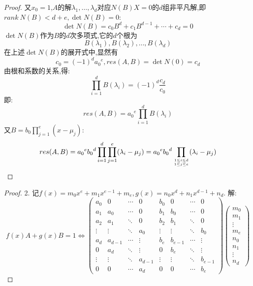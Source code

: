 \documentclass{article}
\begin{document}
\begin{enumerate}
\begin{proof}
    又$x_0=1$,$A$的解$\lambda_1,\ldots,\lambda_d$对应$N(B)X=0$的$d$组非平凡解,即$rank\ N(B)<d+e,\det N(B)=0$:
    \[
        \det N(B)=c_0 B^d+ c_1 B^{d-1}+ \cdots+ c_d=0
    \]
    $\det N(B)$作为$B$的$d$次多项式,它的$d$个根为
    \[B(\lambda_1),B(\lambda_2),\ldots,B(\lambda_d)\]
    在上述$\det N(B)$的展开式中,显然有
    \[c_0={(-1)}^d {a_0}^e,res(A,B)=\det N(0)=c_d\]
    由根和系数的关系,得:
    \[\prod\limits_{i=1}^d B(\lambda_i)={(-1)}^d \frac{c_d}{c_0}\]
    即:
    \[res(A,B)={a_0}^e \prod\limits_{i=1}^d B(\lambda_i)\]
    又$B=b_0\prod\limits_{j=1}^e (x-\mu_j)$:
    \[
        res(A,B)
        ={a_0}^e {b_0}^d \prod\limits_{i=1}^d \prod\limits_{j=1}^e (\lambda_i-\mu_j)
        ={a_0}^e {b_0}^d \prod\limits_{1\leq i\leq d \atop 1\leq j\leq e}(\lambda_i -\mu_j)
    \]
    \end{proof}
    \begin{proof}2.
    记$f(x)=m_0 x^e + m_1 x^{e-1} + m_e,g(x)=n_0 x^d + n_1 x^{d-1} + n_d$.
    解:
    \[
        f(x)A+g(x)B=1
        \Leftrightarrow
        \begin{pmatrix}
            a_0    &   0    & \cdots &      0 &    b_0 &      0 & \cdots & 0\\
            a_1    & a_0    & \cdots &      0 &    b_1 &    b_0 & \cdots & 0\\
            a_2    & a_1    & \ddots &      0 &    b_2 &    b_1 & \ddots & 0\\
            \vdots & \vdots & \ddots &    a_0 & \vdots & \vdots & \ddots & b_0\\
            a_d    & a_{d-1}& \cdots & \vdots &    b_e & b_{e-1}& \cdots & \vdots\\
            0      & a_d    & \ddots & \vdots &      0 &    b_e & \ddots & \vdots\\
            \vdots & \vdots & \ddots & a_{d-1}& \vdots & \vdots & \ddots & b_{e-1}\\
            0      &   0    & \cdots &    a_d &      0 &      0 & \cdots & b_e
        \end{pmatrix}
        \begin{pmatrix}
            m_0\\
            m_1\\
            \vdots\\
            m_e\\
            n_0\\
            n_1\\
            \vdots\\
            n_d
        \end{pmatrix}
\]
\end{proof}
\end{enumerate}
\end{document}
